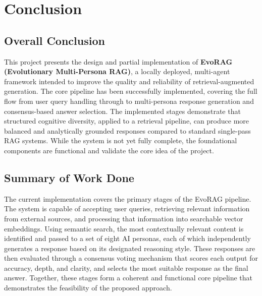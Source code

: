 \chapter{Conclusion}

\section{Overall Conclusion}

This project presents the design and partial implementation of \textbf{EvoRAG (Evolutionary Multi-Persona RAG)}, a locally deployed, multi-agent framework intended to improve the quality and reliability of retrieval-augmented generation. The core pipeline has been successfully implemented, covering the full flow from user query handling through to multi-persona response generation and consensus-based answer selection. The implemented stages demonstrate that structured cognitive diversity, applied to a retrieval pipeline, can produce more balanced and analytically grounded responses compared to standard single-pass RAG systems. While the system is not yet fully complete, the foundational components are functional and validate the core idea of the project.

\section{Summary of Work Done}

The current implementation covers the primary stages of the EvoRAG pipeline. The system is capable of accepting user queries, retrieving relevant information from external sources, and processing that information into searchable vector embeddings. Using semantic search, the most contextually relevant content is identified and passed to a set of eight AI personas, each of which independently generates a response based on its designated reasoning style. These responses are then evaluated through a consensus voting mechanism that scores each output for accuracy, depth, and clarity, and selects the most suitable response as the final answer. Together, these stages form a coherent and functional core pipeline that demonstrates the feasibility of the proposed approach.

